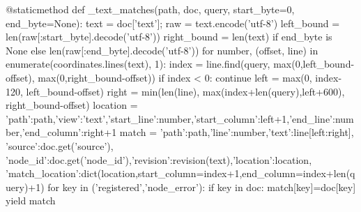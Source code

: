     @staticmethod
    def _text_matches(path, doc, query, start_byte=0, end_byte=None):
        text = doc['text']; raw = text.encode('utf-8')
        left_bound = len(raw[:start_byte].decode('utf-8'))
        right_bound = len(text) if end_byte is None else len(raw[:end_byte].decode('utf-8'))
        for number, (offset, line) in enumerate(coordinates.lines(text), 1):
            index = line.find(query, max(0,left_bound-offset), max(0,right_bound-offset))
            if index < 0: continue
            left = max(0, index-120, left_bound-offset)
            right = min(len(line), max(index+len(query),left+600), right_bound-offset)
            location = {'path':path,'view':'text','start_line':number,'start_column':left+1,'end_line':number,'end_column':right+1}
            match = {'path':path,'line':number,'text':line[left:right], 'source':doc.get('source'),
                     'node_id':doc.get('node_id'),'revision':revision(text),'location':location,
                     'match_location':dict(location,start_column=index+1,end_column=index+len(query)+1)}
            for key in ('registered','node_error'):
                if key in doc: match[key]=doc[key]
            yield match

